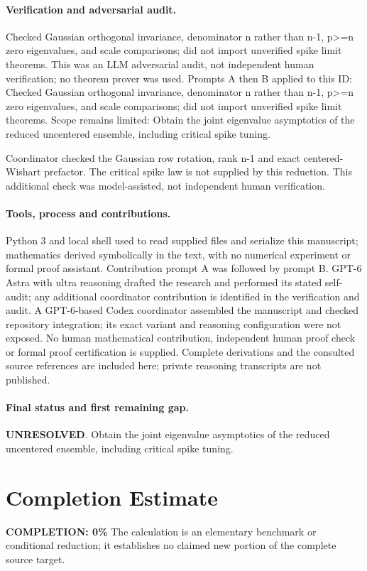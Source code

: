 \documentclass[11pt]{article}
\begin{document}
\paragraph{Verification and adversarial audit.}
Checked Gaussian orthogonal invariance, denominator n rather than n-1, p>=n zero eigenvalues, and scale comparisons; did not import unverified spike limit theorems. This was an LLM adversarial audit, not independent human verification; no theorem prover was used. Prompts A then B applied to this ID: Checked Gaussian orthogonal invariance, denominator n rather than n-1, p>=n zero eigenvalues, and scale comparisons; did not import unverified spike limit theorems. Scope remains limited: Obtain the joint eigenvalue asymptotics of the reduced uncentered ensemble, including critical spike tuning.

Coordinator checked the Gaussian row rotation, rank n-1 and exact centered-Wishart prefactor. The critical spike law is not supplied by this reduction. This additional check was model-assisted, not independent human verification.

\paragraph{Tools, process and contributions.}
Python 3 and local shell used to read supplied files and serialize this manuscript; mathematics derived symbolically in the text, with no numerical experiment or formal proof assistant. Contribution prompt A was followed by prompt B. GPT-6 Astra with ultra reasoning drafted the research and performed its stated self-audit; any additional coordinator contribution is identified in the verification and audit. A GPT-6-based Codex coordinator assembled the manuscript and checked repository integration; its exact variant and reasoning configuration were not exposed. No human mathematical contribution, independent human proof check or formal proof certification is supplied. Complete derivations and the consulted source references are included here; private reasoning transcripts are not published.

\paragraph{Final status and first remaining gap.}
\textbf{UNRESOLVED}. Obtain the joint eigenvalue asymptotics of the reduced uncentered ensemble, including critical spike tuning.

\section{Completion Estimate}
\noindent\textbf{COMPLETION: 0\%}
The calculation is an elementary benchmark or conditional reduction; it establishes no claimed new portion of the complete source target.
\end{document}
